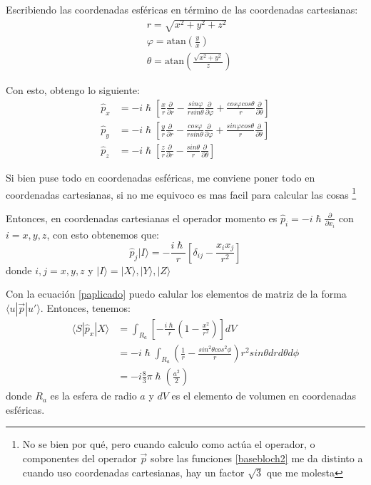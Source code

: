 \documentclass[10pt,a4paper]{article}
\begin{document}
Escribiendo las coordenadas esf\'ericas en t\'ermino de las coordenadas cartesianas:
\begin{equation}
\begin{split}
&r=\sqrt{x^2+y^2+z^2} \\
&\varphi=\text{atan}\left(\frac{y}{x}\right)\\
&\theta=\text{atan}\left(\frac{\sqrt{x^2+y^2}}{z}\right)
\end{split}
\end{equation}

Con esto, obtengo lo siguiente:
\begin{equation}
\begin{split}
\hat{p}_x&=-i\hslash\left[\frac{x}{r}\frac{\partial}{\partial r}-\frac{sin\varphi}{r sin\theta}\frac{\partial}{\partial \varphi}+\frac{cos\varphi cos\theta}{r} \frac{\partial}{\partial \theta} \right] \\
\hat{p}_y&=-i\hslash\left[\frac{y}{r}\frac{\partial}{\partial r}-\frac{cos\varphi}{r sin\theta}\frac{\partial}{\partial \varphi}+\frac{sin\varphi cos\theta}{r} \frac{\partial}{\partial \theta} \right] \\
\hat{p}_z&=-i\hslash\left[\frac{z}{r}\frac{\partial}{\partial r}-\frac{sin\theta}{r} \frac{\partial}{\partial \theta} \right]
\end{split}
\end{equation}

Si bien puse todo en coordenadas esf\'ericas, me conviene poner todo en coordenadas cartesianas, si no me equivoco es mas facil 
para calcular las cosas \footnote{No se bien por qu\'e, pero cuando calculo como act\'ua el operador, o componentes del operador 
$\vec{p}$ sobre las funciones \ref{basebloch2} me da distinto a cuando uso coordenadas cartesianas, hay un factor $\sqrt{3}$ que me 
molesta}

Entonces, en coordenadas cartesianas el operador momento es $\hat{p}_i=-i\hslash \frac{\partial}{\partial x_i}$ con $i=x,y,z$, con esto 
obtenemos que:
\begin{equation}\label{paplicado}
\hat{p}_j|I\rangle= -\frac{i\hslash}{r}\left[\delta_{ij}-\frac{x_ix_j}{r^2} \right]
\end{equation}
donde $i,j=x,y,z$ y $|I\rangle=|X\rangle, |Y\rangle, |Z\rangle$

Con la ecuaci\'on \ref{paplicado} puedo calular los elementos de matriz de la forma $\langle u|\vec{p}|u'\rangle$. Entonces, 
tenemos:
\begin{equation}
\begin{split}
\langle S|\hat{p}_x|X\rangle&=\int_{R_a} \left[-\frac{i\hslash}{r}\left(1-\frac{x^2}{r^2} \right) \right]dV \\
                            &=-i\hslash\int_{R_a} \left(\frac{1}{r}-\frac{sin^2\theta cos^2\phi}{r} \right) r^2 sin\theta dr d\theta d\phi \\
                            &=-i\frac{8}{3} \pi\hslash \left( \frac{a^2}{2} \right)
\end{split}
\end{equation}
donde $R_{a}$ es la esfera de radio $a$ y $dV$ es el elemento de volumen en coordenadas esf\'ericas.
\end{document}
